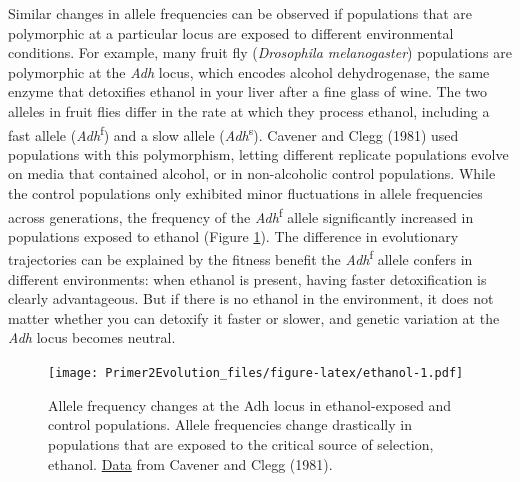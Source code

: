 \documentclass[
]{book}
\begin{document}
Similar changes in allele frequencies can be observed if populations that are polymorphic at a particular locus are exposed to different environmental conditions. For example, many fruit fly (\emph{Drosophila melanogaster}) populations are polymorphic at the \emph{Adh} locus, which encodes alcohol dehydrogenase, the same enzyme that detoxifies ethanol in your liver after a fine glass of wine. The two alleles in fruit flies differ in the rate at which they process ethanol, including a fast allele (\emph{Adh}\textsuperscript{f}) and a slow allele (\emph{Adh}\textsuperscript{s}). Cavener and Clegg (1981) used populations with this polymorphism, letting different replicate populations evolve on media that contained alcohol, or in non-alcoholic control populations. While the control populations only exhibited minor fluctuations in allele frequencies across generations, the frequency of the \emph{Adh}\textsuperscript{f} allele significantly increased in populations exposed to ethanol (Figure \ref{fig:ethanol}). The difference in evolutionary trajectories can be explained by the fitness benefit the \emph{Adh}\textsuperscript{f} allele confers in different environments: when ethanol is present, having faster detoxification is clearly advantageous. But if there is no ethanol in the environment, it does not matter whether you can detoxify it faster or slower, and genetic variation at the \emph{Adh} locus becomes neutral.

\begin{figure}
\centering
\texttt{[image: Primer2Evolution\_files/figure-latex/ethanol-1.pdf]}
\caption{\label{fig:ethanol}Allele frequency changes at the Adh locus in ethanol-exposed and control populations. Allele frequencies change drastically in populations that are exposed to the critical source of selection, ethanol. \href{data/5_ethanol.csv}{Data} from Cavener and Clegg (1981).}
\end{figure}
\end{document}
